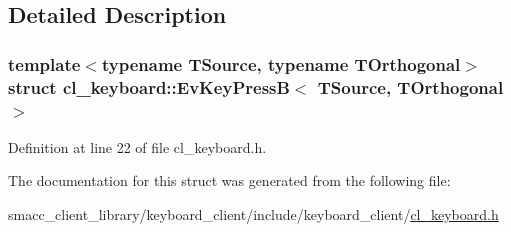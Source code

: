 \subsection{Detailed Description}
\subsubsection*{template$<$typename T\+Source, typename T\+Orthogonal$>$\newline
struct cl\+\_\+keyboard\+::\+Ev\+Key\+Press\+B$<$ T\+Source, T\+Orthogonal $>$}



Definition at line 22 of file cl\+\_\+keyboard.\+h.



The documentation for this struct was generated from the following file\+:\begin{DoxyCompactItemize}
\item 
smacc\+\_\+client\+\_\+library/keyboard\+\_\+client/include/keyboard\+\_\+client/\hyperlink{cl__keyboard_8h}{cl\+\_\+keyboard.\+h}\end{DoxyCompactItemize}

